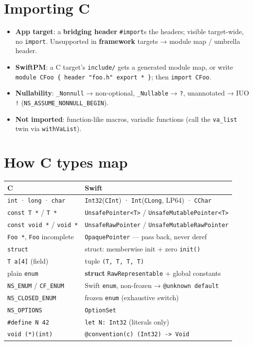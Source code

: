 \documentclass[8pt]{extarticle}
\begin{document}
\begin{multicols}{2}
\raggedright

\section{Importing C}
\begin{itemize}
  \item \textbf{App target}: a \textbf{bridging header} \texttt{\#import}s the headers;
        visible target-wide, no \texttt{import}. Unsupported in \textbf{framework}
        targets → module map / umbrella header.
  \item \textbf{SwiftPM}: a C target's \texttt{include/} gets a generated module map, or
        write \texttt{module CFoo \{ header "foo.h" export * \}}; then \texttt{import CFoo}.
  \item \textbf{Nullability}: \texttt{\_Nonnull} → non-optional, \texttt{\_Nullable}
        → \texttt{?}, unannotated → IUO \texttt{!} (\texttt{NS\_ASSUME\_NONNULL\_BEGIN}).
  \item \textbf{Not imported}: function-like macros, variadic functions (call the
        \texttt{va\_list} twin via \texttt{withVaList}).
\end{itemize}

\section{How C types map}
{\footnotesize\setlength{\tabcolsep}{3pt}
\begin{tabular}{@{}L{25mm}L{48mm}@{}}
\toprule
\textbf{C} & \textbf{Swift} \\
\midrule
\texttt{int} · \texttt{long} · \texttt{char} & \texttt{Int32}(\texttt{CInt}) · \texttt{Int}(\texttt{CLong}, LP64) · \texttt{CChar} \\
\texttt{const T *} / \texttt{T *} & \texttt{UnsafePointer<T>} / \texttt{UnsafeMutablePointer<T>} \\
\texttt{const void *} / \texttt{void *} & \texttt{UnsafeRawPointer} / \texttt{UnsafeMutableRawPointer} \\
\texttt{Foo *}, \texttt{Foo} incomplete & \texttt{OpaquePointer} — pass back, never deref \\
\texttt{struct} & struct: memberwise init + zero \texttt{init()} \\
\texttt{T a[4]} (field) & tuple \texttt{(T, T, T, T)} \\
plain \texttt{enum} & \textbf{struct} \texttt{RawRepresentable} + global constants \\
\texttt{NS\_ENUM} / \texttt{CF\_ENUM} & Swift \texttt{enum}, non-frozen → \texttt{@unknown default} \\
\texttt{NS\_CLOSED\_ENUM} & frozen \texttt{enum} (exhaustive switch) \\
\texttt{NS\_OPTIONS} & \texttt{OptionSet} \\
\texttt{\#define N 42} & \texttt{let N: Int32} (literals only) \\
\texttt{void (*)(int)} & \texttt{@convention(c) (Int32) \hbox{-}\hbox{>} Void} \\
\bottomrule
\end{tabular}}


\end{multicols}
\end{document}
